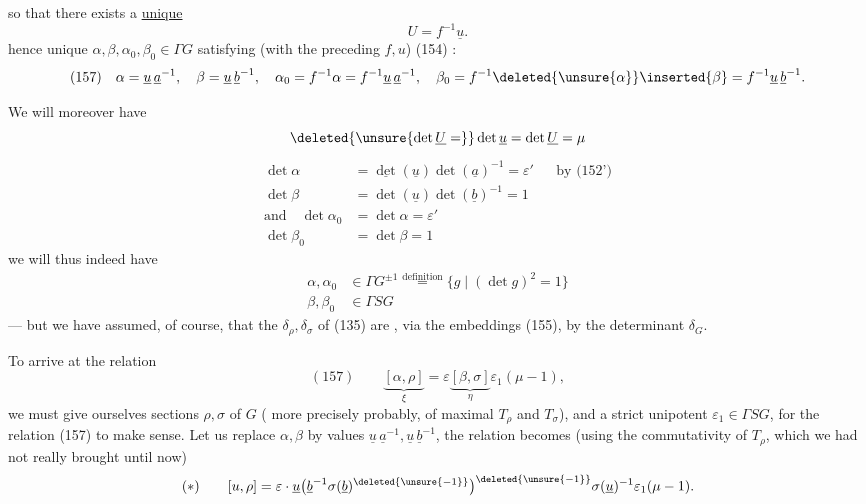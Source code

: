 so that  there exists a \uline{unique} 
\[
U=f^{-1}\underline u.
\]
hence unique $\alpha,\beta,\alpha_0,\beta_0\in\Gamma G$ satisfying (with the preceding $f,u$) (154) :
\[
(157)\quad
\alpha=\underline u\,\underline a^{-1},\quad
\beta=\underline u\,\underline b^{-1},\quad
\alpha_0=f^{-1}\alpha=f^{-1}\underline u\,\underline a^{-1},\quad
\beta_0=f^{-1}\deleted{\unsure{\alpha}}\inserted{\beta}=f^{-1}\underline u\,\underline b^{-1}.
\]


We will moreover have
\[
\deleted{\unsure{\det\underline U=}}\det\underline u
=\det\underline U=\mu
\]
\[
\begin{aligned}
\det\alpha&=\underline{\det}(\underline u)\det(\underline a)^{-1}=\varepsilon'
&&\text{by (152')}\\
\det\beta&=\det(\underline u)\det(\underline b)^{-1}=1\\[3pt]
\text{and}\quad\det\alpha_0&=\det\alpha=\varepsilon'\\
\det\beta_0&=\det\beta=1
\end{aligned}
\]
we will thus indeed have
\[
\begin{aligned}
\alpha,\alpha_0&\in\Gamma G^{\pm1}\overset{\text{definition}}=
\{g\mid(\det g)^2=1\}\\
\beta,\beta_0&\in\Gamma SG
\end{aligned}
\]
--- but we have assumed, of course, that the  $\delta_\rho,\delta_\sigma$ of (135) are , via the embeddings (155), by the determinant $\delta_G$.

To arrive at the relation  
\[
(157)\qquad
\underbrace{[\alpha,\rho]}_{\xi}
=\varepsilon\underbrace{[\beta,\sigma]}_{\eta}\varepsilon_1(\mu-1),
\]
we must give ourselves sections $\rho,\sigma$ of $G$ ( more precisely probably,  of maximal $T_\rho$ and $T_\sigma$), and a strict unipotent $\varepsilon_1\in\Gamma SG$, for the relation (157) to make sense.
Let us replace $\alpha,\beta$ by  values $\underline u\,\underline a^{-1},\underline u\,\underline b^{-1}$, the relation becomes (using the commutativity of $T_\rho$,  which we had not really brought  until now)
\[
(*)\qquad
[u,\rho]
=\varepsilon\cdot\underline u
\bigl(\underline b^{-1}\sigma(\underline b)^{\deleted{\unsure{-1}}}\bigr)^{\deleted{\unsure{-1}}}
\sigma(\underline u)^{-1}\varepsilon_1(\mu-1).
\]

